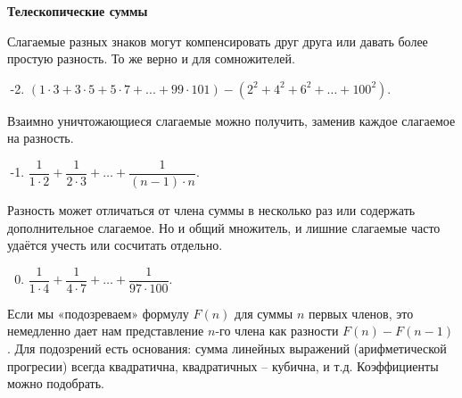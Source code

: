 \documentclass{article}
\begin{document}
\large
	
	
	\begin{center}
		\textbf{Телескопические суммы}
	\end{center}

Слагаемые разных знаков могут компенсировать друг друга или давать более простую разность. То же верно и для сомножителей.

\begin{enumerate}[label*=\protect\fbox{\arabic{enumi}}]

\setcounter{enumi}{-3}

\item $(1\cdot 3+3\cdot 5+5\cdot 7+...+99\cdot 101) - (2^2+4^2+6^2+ \dotsc +100^2).$
\end{enumerate}

Взаимно уничтожающиеся слагаемые можно получить, заменив каждое слагаемое на разность.

\begin{enumerate}[label*=\protect\fbox{\arabic{enumi}}]
	
\setcounter{enumi}{-2}

\item $\dfrac{1}{1 \cdot 2} + \dfrac{1}{2 \cdot 3} + \dotsc +  \dfrac{1}{(n-1) \cdot n}.$
	


\end{enumerate}

Разность может отличаться от члена суммы в несколько раз или содержать дополнительное слагаемое. Но и общий множитель, и лишние слагаемые часто удаётся учесть или сосчитать отдельно.

\begin{enumerate}[label*=\protect\fbox{\arabic{enumi}}]
	
	\setcounter{enumi}{-1}
	
	\item $\dfrac{1}{1 \cdot 4} + \dfrac{1}{4 \cdot 7} + \dotsc +  \dfrac{1}{97 \cdot 100}.$
	
\end{enumerate}

Если мы «подозреваем» формулу $F(n)$ для суммы $n$ первых членов, это немедленно дает нам представление $n$-го члена как разности $F(n)-F(n-1)$. Для подозрений есть основания: сумма линейных выражений (арифметической прогресии) всегда квадратична, квадратичных – кубична, и т.д. Коэффициенты можно подобрать.
\end{document}
